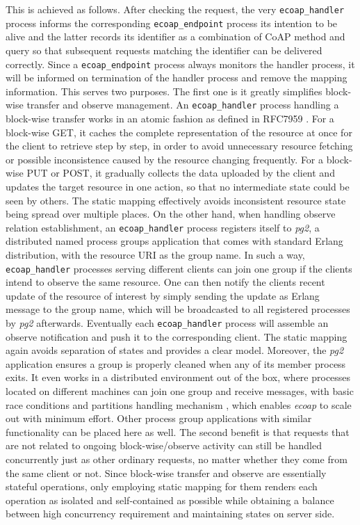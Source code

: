 This is achieved as follows. After checking the request, the very \verb|ecoap_handler| process informs the corresponding \verb|ecoap_endpoint| process its intention to be alive and the latter records its identifier as a combination of CoAP method and query so that subsequent requests matching the identifier can be delivered correctly. Since a \verb|ecoap_endpoint| process always monitors the handler process, it will be informed on termination of the handler process and remove the mapping information. This serves two purposes. The first one is it greatly simplifies block-wise transfer and observe management. An \verb|ecoap_handler| process handling a block-wise transfer works in an atomic fashion as defined in RFC7959 \cite{blockwise}. For a block-wise GET, it caches the complete representation of the resource at once for the client to retrieve step by step, in order to avoid unnecessary resource fetching or possible inconsistence caused by the resource changing frequently. For a block-wise PUT or POST,  it gradually collects the data uploaded by the client and updates the target resource in one action, so that no intermediate state could be seen by others. The static mapping effectively avoids inconsistent resource state being spread over multiple places. On the other hand, when handling observe relation establishment, an \verb|ecoap_handler| process registers itself to \textit{pg2}, a distributed named process groups application that comes with standard Erlang distribution, with the resource URI as the group name. In such a way, \verb|ecoap_handler| processes serving different clients can join one group if the clients intend to observe the same resource. One can then notify the clients recent update of the resource of interest by simply sending the update as Erlang message to the group name, which will be broadcasted to all registered processes by \textit{pg2} afterwards. Eventually each \verb|ecoap_handler| process will assemble an observe notification and push it to the corresponding client. The static mapping again avoids separation of states and provides a clear model. Moreover, the \textit{pg2} application ensures a group is properly cleaned when any of its member process exits. It even works in a distributed environment out of the box, where processes located on different machines can join one group and receive messages, with basic race conditions and partitions handling mechanism \cite{pg2_failure}, which enables \textit{ecoap} to scale out with minimum effort. Other process group applications with similar functionality can be placed here as well. The second benefit is that requests that are not related to ongoing block-wise/observe activity can still be handled concurrently just as other ordinary requests, no matter whether they come from the same client or not. Since block-wise transfer and observe are essentially stateful operations, only employing static mapping for them renders each operation as isolated and self-contained as possible while obtaining a balance between high concurrency requirement and maintaining states on server side.

